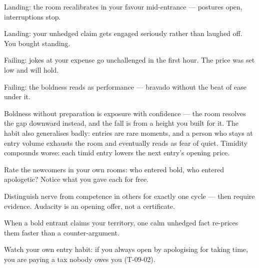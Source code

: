 \begin{feedback}
  \item Landing: the room recalibrates in your favour mid-entrance --- postures open, interruptions stop.
  \item Landing: your unhedged claim gets engaged seriously rather than laughed off. You bought standing.
  \item Failing: jokes at your expense go unchallenged in the first hour. The price was set low and will hold.
  \item Failing: the boldness reads as performance --- bravado without the beat of ease under it.
\end{feedback}
\begin{failure}
Boldness without preparation is exposure with confidence --- the room resolves the gap downward instead, and the fall is from a height you built for it. The habit also generalises badly: entries are rare moments, and a person who stays at entry volume exhausts the room and eventually reads as fear of quiet. Timidity compounds worse: each timid entry lowers the next entry's opening price.
\end{failure}
\begin{countermeasures}
  \item Rate the newcomers in your own rooms: who entered bold, who entered apologetic? Notice what you gave each for free.
  \item Distinguish nerve from competence in others for exactly one cycle --- then require evidence. Audacity is an opening offer, not a certificate.
  \item When a bold entrant claims your territory, one calm unhedged fact re-prices them faster than a counter-argument.
  \item Watch your own entry habit: if you always open by apologising for taking time, you are paying a tax nobody owes you (T-09-02).
\end{countermeasures}

\seesources
{}

